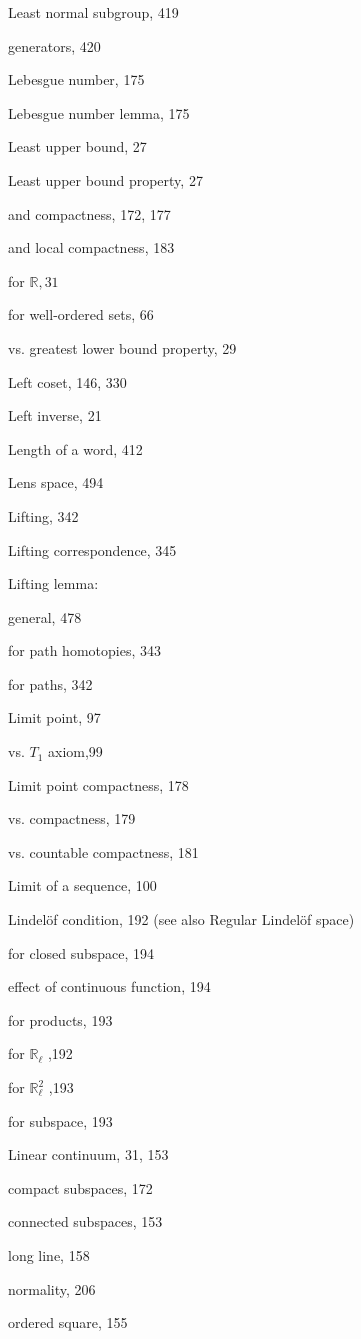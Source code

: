 Least normal subgroup, 419

generators, 420

Lebesgue number, 175

Lebesgue number lemma, 175

Least upper bound, 27

Least upper bound property, 27

and compactness, 172, 177

and local compactness, 183

for \(\mathbb{R},{31}\)

for well-ordered sets, 66

vs. greatest lower bound property, 29

Left coset, 146, 330

Left inverse, 21

Length of a word, 412

Lens space, 494

Lifting, 342

Lifting correspondence, 345

Lifting lemma:

general, 478

for path homotopies, 343

for paths, 342

Limit point, 97

vs. \({T}_{1}\) axiom,99

Limit point compactness, 178

vs. compactness, 179

vs. countable compactness, 181

Limit of a sequence, 100

Lindelöf condition, 192 (see also Regular Lindelöf space)

for closed subspace, 194

effect of continuous function, 194

for products, 193

for \({\mathbb{R}}_{\ell }\) ,192

for \({\mathbb{R}}_{\ell }^{2}\) ,193

for subspace, 193

Linear continuum, 31, 153

compact subspaces, 172

connected subspaces, 153

long line, 158

normality, 206

ordered square, 155

